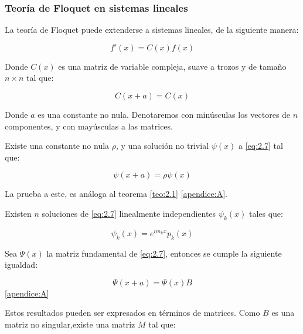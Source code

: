 \subsubsection{Teoría de Floquet en sistemas lineales}

La teoría de Floquet puede extenderse a sistemas lineales, de la siguiente manera:

\begin{equation}\label{eq:2.7}
    f'(x)=C(x)f(x)
\end{equation}

Donde $C(x)$ es una matriz de variable compleja, suave a trozos y de tamaño $n \times n$ tal que: 

\begin{equation}\label{eq:2.8}
    C(x+a)=C(x)
\end{equation}

Donde $a$ es una constante no nula. Denotaremos con minúsculas los vectores de $n$ componentes, y con mayúsculas a las matrices.

\begin{teo}\label{teo:2.3}
Existe una constante no nula $\rho$, y una solución no trivial $\psi(x)$ a \ref{eq:2.7} tal que: 

\begin{equation}\label{eq:2.9}
    \psi(x+a)=\rho \psi(x)
\end{equation}

La prueba a este, es análoga al teorema \ref{teo:2.1} \cite{floquet} \ref{apendice:A}.\\ 
\end{teo}

\begin{teo}\label{teo:2.4}
Existen $n$ soluciones de \ref{eq:2.7} linealmente independientes $\psi_k(x)$ tales que:

\begin{equation}\label{eq:2.10}
    \psi_k(x)=e^{im_kx}p_k(x)
\end{equation}

Sea $\Psi(x)$ la matriz fundamental de \ref{eq:2.7}, entonces se cumple la siguiente igualdad:

\begin{equation}\label{eq:2.11}
    \Psi(x+a)=\Psi(x)B
\end{equation}
\cite{floquet} \ref{apendice:A}
\end{teo}

Estos resultados pueden ser expresados en términos de matrices. Como $B$ es una matriz no singular,existe una matriz $M$ tal que:

